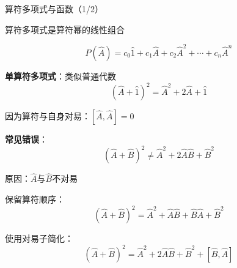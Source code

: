 \begin{frame}{算符多项式与函数（1/2）}
  
    \begin{iqbitemize}
    \item 算符多项式是算符幂的线性组合
    \end{iqbitemize}
      \[
        P(\hat{A}) = c_0\hat{1} + c_1\hat{A} + c_2\hat{A}^2 + \cdots + c_n\hat{A}^n
      \]
    \begin{iqbitemize}
    \item \textbf{单算符多项式}：类似普通代数
    \[
      (\hat{A} + \hat{1})^2 = \hat{A}^2 + 2\hat{A} + \hat{1}
    \]
    \item 因为算符与自身对易：$[\hat{A}, \hat{A}] = 0$
    \end{iqbitemize}
    \iqbsmallsep

    \begin{iqbitemize}
    \item \textbf{常见错误}：
    \[
      (\hat{A} + \hat{B})^2 \neq \hat{A}^2 + 2\hat{A}\hat{B} + \hat{B}^2
    \]
    \item 原因：$\hat{A}$与$\hat{B}$不对易
    \end{iqbitemize}
    \iqbtinysep

    \begin{iqbitemize}
    \item 保留算符顺序：
    \[
      (\hat{A} + \hat{B})^2 = \hat{A}^2 + \hat{A}\hat{B} + \hat{B}\hat{A} + \hat{B}^2
    \]
    \item 使用对易子简化：
    \[
      (\hat{A} + \hat{B})^2 = \hat{A}^2 + 2\hat{A}\hat{B} + \hat{B}^2 + [\hat{B}, \hat{A}]
    \]
    \end{iqbitemize}
  
\end{frame}

